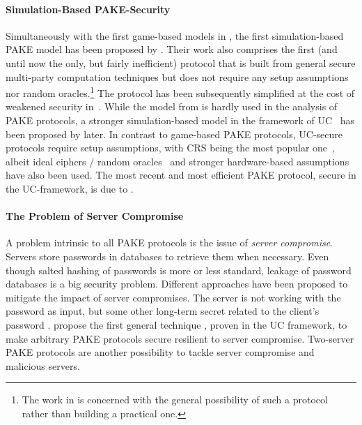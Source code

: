 \paragraph{Simulation-Based \ac{PAKE}-Security}
Simultaneously with the first game-based models in \cite{Bellare2000,Boyko2000}, the first simulation-based \ac{PAKE} model has been proposed by \citet{Goldreich01}.
Their work also comprises the first (and until now the only, but fairly inefficient) protocol that is built from general secure multi-party computation techniques but does not require any setup assumptions nor random oracles.\footnote{The work in \cite{Goldreich01} is concerned with the general possibility of such a protocol rather than building a practical one.}
The protocol has been subsequently simplified at the cost of weakened security in~\cite{NguyenV04}.
While the model from \cite{Goldreich01} is hardly used in the analysis of \ac{PAKE} protocols, a stronger simulation-based model in the framework of \acl{UC}~\cite{Canetti2001a} has been proposed by \citet{Canetti2005} later.
In contrast to game-based \ac{PAKE} protocols, \ac{UC}-secure protocols require setup assumptions, with \ac{CRS} being the most popular one~\cite{Katz2011}, albeit ideal ciphers / random oracles~\cite{Abdalla2008} and stronger hardware-based assumptions~\cite{cryptoeprint:2012:537} have also been used.
The most recent and most efficient \ac{PAKE} protocol, secure in the \ac{UC}-framework, is due to \citet{Benhamouda2013}.

\paragraph{The Problem of Server Compromise}
A problem intrinsic to all \ac{PAKE} protocols is the issue of \emph{server compromise}.
Servers store passwords in databases to retrieve them when necessary.
Even though salted hashing of passwords is more or less standard, leakage of password databases is a big security problem.
Different approaches have been proposed to mitigate the impact of server compromises.
The server is not working with the password as input, but some other long-term secret related to the client's password \cite{Wu1998,Boyen2009a}.
\citeauthor{Gentry2006} propose the first general technique \cite{Gentry2006}, proven in the \ac{UC} framework, to make arbitrary \ac{PAKE} protocols secure resilient to server compromise.
Two-server \ac{PAKE} protocols are another possibility to tackle server compromise and malicious servers.

